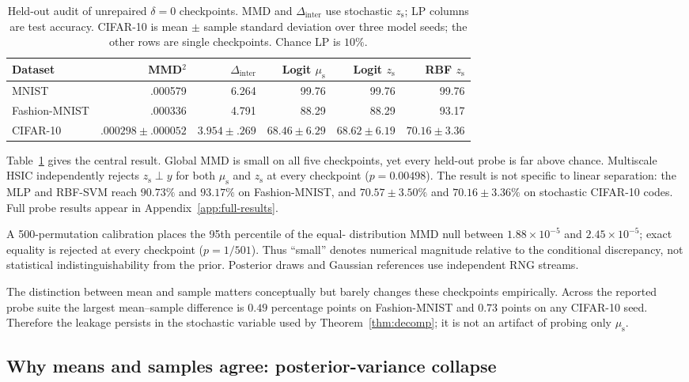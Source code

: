 \documentclass{article}
\newcommand{\zs}{z_{\mathrm{s}}}
\newcommand{\mus}{\mu_{\mathrm{s}}}
\newcommand{\Dinter}{\Delta_{\mathrm{inter}}}
\begin{document}
\begin{table}[ht]
\caption{Held-out audit of unrepaired $\delta=0$ checkpoints.  MMD and
$\Dinter$ use stochastic $\zs$; LP columns are test accuracy.  CIFAR-10 is
mean $\pm$ sample standard deviation over three model seeds; the other rows
are single checkpoints.  Chance LP is $10\%$.}
\label{tab:stage0}
\centering
\small
\begin{tabular}{lrrrrr}
\toprule
Dataset & MMD$^2$ & $\Dinter$ & Logit $\mus$ & Logit $\zs$ & RBF $\zs$ \\
\midrule
MNIST & .000579 & 6.264 & 99.76 & 99.76 & 99.76 \\
Fashion-MNIST & .000336 & 4.791 & 88.29 & 88.29 & 93.17 \\
CIFAR-10 & $.000298\!\pm\!.000052$ & $3.954\!\pm\!.269$ &
$68.46\!\pm\!6.29$ & $68.62\!\pm\!6.19$ & $70.16\!\pm\!3.36$ \\
\bottomrule
\end{tabular}
\end{table}

Table~\ref{tab:stage0} gives the central result.  Global MMD is small on all
five checkpoints, yet every held-out probe is far above chance.  Multiscale
HSIC independently rejects $\zs\perp y$ for both $\mus$ and $\zs$ at every
checkpoint ($p=0.00498$).  The result is not specific to linear separation:
the MLP and RBF-SVM reach $90.73\%$ and $93.17\%$ on Fashion-MNIST, and
$70.57\!\pm\!3.50\%$ and $70.16\!\pm\!3.36\%$ on stochastic CIFAR-10 codes.
Full probe results appear in Appendix~\ref{app:full-results}.

A 500-permutation calibration places the 95th percentile of the equal-
distribution MMD null between $1.88\!\times\!10^{-5}$ and
$2.45\!\times\!10^{-5}$; exact equality is rejected at every checkpoint
($p=1/501$).  Thus ``small'' denotes numerical magnitude relative to the
conditional discrepancy, not statistical indistinguishability from the
prior.  Posterior draws and Gaussian references use independent RNG streams.

The distinction between mean and sample matters conceptually but barely
changes these checkpoints empirically.  Across the reported probe suite the
largest mean--sample difference is $0.49$ percentage points on
Fashion-MNIST and $0.73$ points on any CIFAR-10 seed.  Therefore the leakage
persists in the stochastic variable used by Theorem~\ref{thm:decomp}; it is
not an artifact of probing only $\mus$.
\FloatBarrier

\subsection{Why means and samples agree: posterior-variance collapse}
\end{document}
